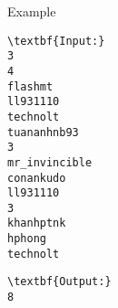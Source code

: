 Example
\begin{verbatim}
\textbf{Input:}
3
4
flashmt
ll931110
technolt
tuananhnb93
3
mr_invincible
conankudo
ll931110
3
khanhptnk
hphong
technolt\end{verbatim}
\begin{verbatim}
\textbf{Output:}
8\end{verbatim}